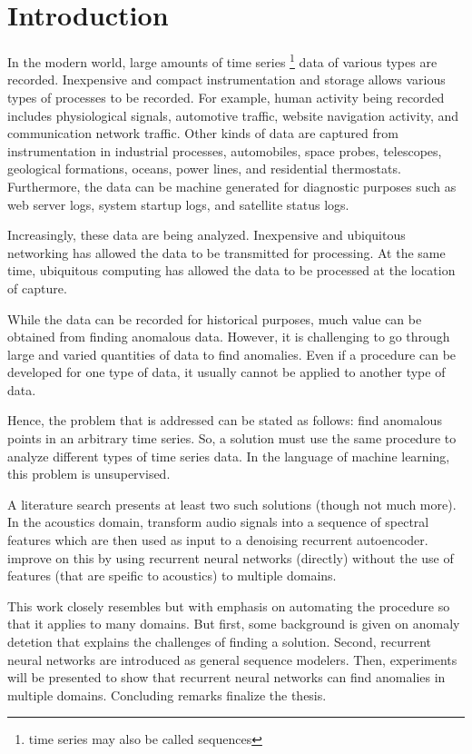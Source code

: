 \chapter[intro]{Introduction}


In the modern world, large amounts of time series \footnote{time series may also be called sequences} data of various types are recorded.  Inexpensive and compact instrumentation and storage allows various types of processes to be recorded. For example, human activity being recorded includes physiological signals, automotive traffic, website navigation activity, and communication network traffic. Other kinds of data are captured from instrumentation in industrial processes, automobiles, space probes, telescopes, geological formations, oceans, power lines, and residential thermostats. Furthermore, the data can be machine generated for diagnostic purposes such as web server logs, system startup logs, and satellite status logs.

Increasingly, these data are being analyzed. Inexpensive and ubiquitous networking has allowed the data to be transmitted for processing. At the same time, ubiquitous computing has allowed the data to be processed at the location of capture.

While the data can be recorded for historical purposes, much value can be obtained from finding anomalous data. However, it is challenging to go through large and varied quantities of data to find anomalies. Even if a procedure can be developed for one type of data, it usually cannot be applied to another type of data.

Hence, the problem that is addressed can be stated as follows: find anomalous points in an arbitrary time series. So, a solution must use the same procedure to analyze different types of time series data. In the language of machine learning, this problem is unsupervised.

A literature search presents at least two such solutions (though not much more). In the acoustics domain, \cite{Marchi2015} transform audio signals into a sequence of spectral features which are then used as input to a denoising recurrent autoencoder. \cite{Malhotra2015} improve on this by using recurrent neural networks (directly) without the use of features (that are speific to acoustics) to multiple domains.

This work closely resembles \cite{Malhotra2015} but with emphasis on automating the procedure so that it applies to many domains. But first, some background is given on anomaly detetion that explains the challenges of finding a solution. Second, recurrent neural networks are introduced as general sequence modelers. Then, experiments will be presented to show that recurrent neural networks can find anomalies in multiple domains. Concluding remarks finalize the thesis.


